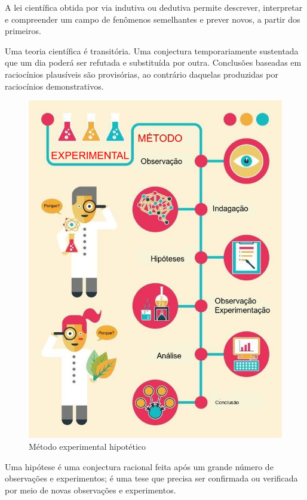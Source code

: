 \documentclass[
]{book}
\begin{document}
\hfill\break

A lei científica obtida por via indutiva ou dedutiva permite descrever, interpretar e compreender um campo de fenômenos semelhantes e prever novos, a partir dos primeiros.

\hfill\break

Uma teoria científica é transitória. Uma conjectura temporariamente sustentada que um dia poderá ser refutada e substituída por outra. Conclusões baseadas em raciocínios plausíveis são provisórias, ao contrário daquelas produzidas por raciocínios demonstrativos.

\hfill\break

\begin{figure}

{\centering \includegraphics[width=0.8\linewidth]{images11/metodo_experimental} 

}

\caption{Método experimental hipotético}\label{fig:unnamed-chunk-115}
\end{figure}

\hfill\break

Uma hipótese é uma conjectura racional feita após um grande número de observações e experimentos; é uma tese que precisa ser confirmada ou verificada por meio de novas observações e experimentos.
\end{document}
